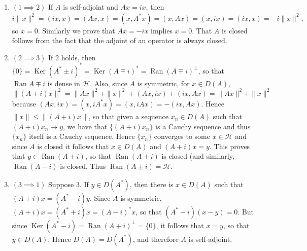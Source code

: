 \documentclass[12pt]{article}
\newcommand{\Ran}{\operatorname{Ran}}
\newcommand{\Ker}{\operatorname{Ker}}
\begin{document}
\begin{enumerate}
\item $(1\implies 2)$ If $A$ is self-adjoint and $Ax = ix$, then $$i\|x\|^2=(ix,x) = (Ax,x) = (x,A^*x) = (x,Ax) = (x,ix) = \overline{(ix,x)} = -i\|x\|^2,$$
so $x=0$. Similarly we prove that $Ax=-ix$ implies $x=0$. That $A$ is closed follows from the fact that the adjoint of an operator is always closed.
\item $(2\implies 3)$ If $2$ holds, then $\{0\}= \Ker (A^*\pm i)^* = \Ker (A \mp i)^* = \Ran(A\mp i)^\perp$, so that $\Ran{A \mp i}$ is dense in $\mathscr{H}$. Also, since $A$ is symmetric, for $x\in D(A)$,
$$\|(A+i)x\|^2=\|Ax\|^2 + \|x\|^2 + (Ax,ix) + (ix,Ax) = \|Ax\|^2 + \|x\|^2$$
because $(Ax,ix) = (x,iA^*x)= (x,iAx) = -(ix,Ax)$.
Hence $\|x\|\leq \|(A+i)x\|$, so that given a sequence $x_n\in D(A)$ such that $(A+i)x_n \to y$, we have that $\{(A+i)x_n\}$ is a Cauchy sequence and thus $\{x_n\}$ itself is a Cauchy sequence. Hence $\{x_n\}$ converges to some $x\in \mathscr{H}$ and since $A$ is closed it follows that $x\in D(A)$ and $(A+i)x = y$. This proves that $y\in \Ran(A+i)$, so that $\Ran(A+i)$ is closed (and similarly, $\Ran(A-i)$ is closed. Thus $\Ran(A\pm i)=\mathscr{H}$.
\item $(3\implies 1)$ Suppose $3$. If $y\in D(A^*)$, then there is $x\in D(A)$ such that $(A+i)x = (A^*-i)y$. Since $A$ is symmetric, $(A+i)x = (A^*+i)x = (A-i)^*x$, so that $(A^*-i)(x-y)=0$. But since $\Ker(A^*-i) = \Ran(A+i)^\perp = \{0\}$, it follows that $x=y$, so that $y\in D(A)$. Hence $D(A)=D(A^*)$, and therefore $A$ is self-adjoint.
\end{enumerate}
\end{document}
